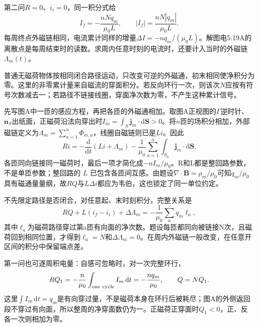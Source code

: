 \documentclass[UTF8,fontset=fandol,a4paper,11pt]{ctexart}
\newcommand{\vect}[1]{\bm{#1}}
\begin{document}
第二问$R=0$、$i_i=0$，同一积分式给
\[
 \boxed{I_f=-\frac{nNq_m}{\mu_0L},\qquad
 |I_f|=\frac{nN|q_m|}{\mu_0L}.}
\]
每周终点外磁链相同，电流累计同样的增量$\Delta I=-nq_m/(\mu_0L)$。解图电5.19A的离散点是每周结束时的读数。求周内任意时刻的电流时，还要计入当时的外磁链$\Lambda_m(t)$。

普通无磁荷物体按相同闭合路径运动，只改变可逆的外磁通，初末相同使净积分为零。这里的非零累计量来自磁流的穿面积分。若反向环行一次，则该次$N$应按有符号次数减去一；若路径不链接线圈，穿面净次数为零，不产生这种累计信号。


先写图A中一匝的感应方程，再把各匝的外磁通相加。取图A正视图的$\Gamma$逆时针、$\vect n_S$出纸面，正磁荷沿法向穿出时$I_m=\int_S\vect j_m\cdot\mathrm d\vect S>0$。将$n$匝的场积分相加，外部磁链定义为$\Lambda_m=\sum_{a=1}^n\Phi_{m,a}$，线圈自磁链则已是$Li$。因此
\[
Ri=-\frac{\mathrm d}{\mathrm dt}(Li+\Lambda_m)
-\frac1{\mu_0}\sum_{a=1}^n\int_{S_a}\vect j_m\cdot\mathrm d\vect S.
\]
各匝同向链接同一磁荷时，最后一项才简化成$-nI_m/\mu_0$。R和L都是整回路参数，不是单匝参数；整回路的 $L$ 已包含各匝间互感。由题设$\nabla\cdot\vect B=\rho_m/\mu_0$可知$q_m/\mu_0$具有磁通量量纲，故$RQ$与$L\Delta i$都应为韦伯，这也锁定了同一单位约定。

不先限定路径是否闭合，对任意起、末时刻积分，完整关系是
\[
RQ+L(i_f-i_i)+\Delta\Lambda_m
=-\frac1{\mu_0}\sum_a q_m\ell_a,
\]
其中$\ell_a$为磁荷路径穿过第a匝有向面的净次数。题设每匝都同向被链接N次，且磁荷回到相同位置，才得到$\ell_a=N$和$\Delta\Lambda_m=0$。在周内外磁链一般改变，在任意开区间的积分中保留端点差。

第一问也可逐周积电量：自感可忽略时，对一次完整环行，
\[
R Q_1=-\frac n{\mu_0}\int_{\rm one\ cycle}I_m\,\mathrm dt
=-\frac{nq_m}{\mu_0},\qquad Q=NQ_1.
\]
这里$\int I_m\,\mathrm dt=q_m$是有向穿过量，不是磁荷本身在环行后被耗尽；图A的外侧返回段不穿过有向面，所以整周的净穿面数仍为一。正磁荷正穿面时$Q_1<0$，正、反各一次则相加为零。
\end{document}
